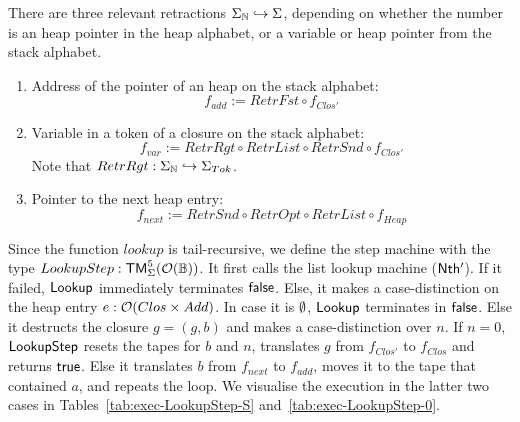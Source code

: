 There are three relevant retractions $\Sigma_{\mathbb{N}} \hookrightarrow \Sigma$, depending on whether the number is an heap pointer in the heap alphabet,
or a variable or heap pointer from the stack alphabet.
\begin{enumerate}
\item Address of the pointer of an heap on the stack alphabet:
  \[
    f_{add} := RetrFst \circ f_{Clos'}
  \]
\item Variable in a token of a closure on the stack alphabet:
  \[
    f_{var} := RetrRgt \circ RetrList \circ RetrSnd \circ f_{Clos'}
  \]
  Note that $RetrRgt : \Sigma_{\mathbb{N}} \hookrightarrow \Sigma_{Tok}$.
\item Pointer to the next heap entry:
  \[
    f_{next} := RetrSnd \circ RetrOpt \circ RetrList \circ f_{Heap}
  \]
\end{enumerate}

Since the function $lookup$ is tail-recursive, we define the step machine with the type $LookupStep : \mathsf{TM}_\Sigma^5(\mathcal{O}(\mathbb{B}))$.  It first calls
the list lookup machine ($\mathsf{Nth'}$).  If it failed, $\mathsf{Lookup}$ immediately terminates $\mathsf{false}$.  Else, it makes a case-distinction on the heap
entry $e : \mathcal{O}(Clos \times Add)$.  In case it is $\emptyset$, $\mathsf{Lookup}$ terminates in $\mathsf{false}$.  Else it destructs the closure $g = (g,b)$ and
makes a case-distinction over $n$.  If $n=0$, $\mathsf{LookupStep}$ resets the tapes for $b$ and $n$, translates $g$ from $f_{Clos'}$ to $f_{Clos}$ and
returns $\mathsf{true}$.  Else it translates $b$ from $f_{next}$ to $f_{add}$, moves it to the tape that contained $a$, and repeats the loop.  We visualise
the execution in the latter two cases in Tables~\ref{tab:exec-LookupStep-S} and~\ref{tab:exec-LookupStep-0}.

